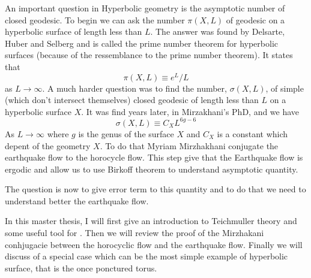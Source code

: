 \vspace{10 px}

An important question in Hyperbolic geometry is the asymptotic number of closed geodesic. To begin we can ask the number $\pi(X,L)$ of geodesic on a hyperbolic surface of length less than $L$. The answer was found by Delsarte, Huber and Selberg and is called the prime number theorem for hyperbolic surfaces (because of the ressemblance to the prime number theorem). It states that \[
\pi(X,L) \equiv e^{L} / L
\]
as $L \to \infty$.
A much harder question was to find the number, $\sigma(X,L)$, of simple (which don't intersect themselves) closed geodesic of length less than $L$ on a hyperbolic surface $X$. It was find years later, in Mirzakhani's PhD, and we have \[
\sigma(X,L) \equiv C_{X}L^{6g-6}
\]
As $L \to \infty$ where $g$ is the genus of the surface $X$ and $C_{X}$ is a constant which depent of the geometry $X$.
To do that Myriam Mirzhakhani conjugate the earthquake flow to the horocycle flow. This step give that the Earthquake flow is ergodic and allow us to use Birkoff theorem to understand asymptotic quantity.

The question is now to give error term to this quantity and to do that we need to understand better the earthquake flow.

In this master thesis, I will first give an introduction to Teichmuller theory and some useful tool for . Then we will review the proof of the Mirzhakani conhjugacie between the horocyclic flow and the earthquake flow. Finally we will discuss of a special case which can be the most simple example of hyperbolic surface, that is the once ponctured torus.
